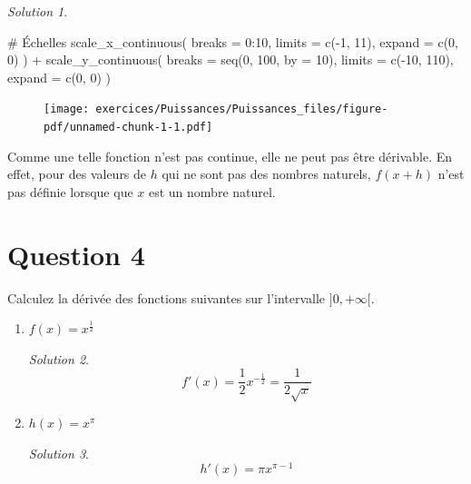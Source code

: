 \documentclass[
  12pt,
  letterpaper,
]{book}
\newenvironment{Shaded}{}{}
\newcommand{\AttributeTok}[1]{\textcolor[rgb]{0.84,0.23,0.29}{#1}}
\newcommand{\CommentTok}[1]{\textcolor[rgb]{0.42,0.45,0.49}{#1}}
\newcommand{\DecValTok}[1]{\textcolor[rgb]{0.00,0.36,0.77}{#1}}
\newcommand{\FunctionTok}[1]{\textcolor[rgb]{0.44,0.26,0.76}{#1}}
\newcommand{\NormalTok}[1]{\textcolor[rgb]{0.14,0.16,0.18}{#1}}
\newcommand{\SpecialCharTok}[1]{\textcolor[rgb]{0.00,0.36,0.77}{#1}}
\theoremstyle{remark}
\newtheorem*{solution}{Solution}
\begin{document}
\begin{solution}
\begin{Shaded}
\begin{Highlighting}[]
  \CommentTok{\# Échelles}
  \FunctionTok{scale\_x\_continuous}\NormalTok{(}
    \AttributeTok{breaks =} \DecValTok{0}\SpecialCharTok{:}\DecValTok{10}\NormalTok{,}
    \AttributeTok{limits =} \FunctionTok{c}\NormalTok{(}\SpecialCharTok{{-}}\DecValTok{1}\NormalTok{, }\DecValTok{11}\NormalTok{),}
    \AttributeTok{expand =} \FunctionTok{c}\NormalTok{(}\DecValTok{0}\NormalTok{, }\DecValTok{0}\NormalTok{)}
\NormalTok{  ) }\SpecialCharTok{+}
  \FunctionTok{scale\_y\_continuous}\NormalTok{(}
    \AttributeTok{breaks =} \FunctionTok{seq}\NormalTok{(}\DecValTok{0}\NormalTok{, }\DecValTok{100}\NormalTok{, }\AttributeTok{by =} \DecValTok{10}\NormalTok{),}
    \AttributeTok{limits =} \FunctionTok{c}\NormalTok{(}\SpecialCharTok{{-}}\DecValTok{10}\NormalTok{, }\DecValTok{110}\NormalTok{),}
    \AttributeTok{expand =} \FunctionTok{c}\NormalTok{(}\DecValTok{0}\NormalTok{, }\DecValTok{0}\NormalTok{)}
\NormalTok{  )}
\end{Highlighting}
\end{Shaded}

\begin{figure}[H]

{\centering \texttt{[image: exercices/Puissances/Puissances\_files/figure-pdf/unnamed-chunk-1-1.pdf]}

}

\end{figure}

Comme une telle fonction n'est pas continue, elle ne peut pas être
dérivable. En effet, pour des valeurs de \(h\) qui ne sont pas des
nombres naturels, \(f(x+h)\) n'est pas définie lorsque que \(x\) est un
nombre naturel.

\end{solution}

\hypertarget{question-4-1}{%
\section{Question 4}\label{question-4-1}}

Calculez la dérivée des fonctions suivantes sur l'intervalle
\(]0,+\infty[\).

\begin{enumerate}
\item
  \(f(x) = x^{\frac{1}{2}}\)

  \begin{solution}

  \[f'(x) = \frac{1}{2}x^{-\frac{1}{2}}=\frac{1}{2\sqrt{x}}\]

  \end{solution}
\item
  \(h(x) = x^{\pi}\)

  \begin{solution}

  \[h'(x) = \pi x^{\pi-1}\]

  \end{solution}
\end{enumerate}
\end{document}
